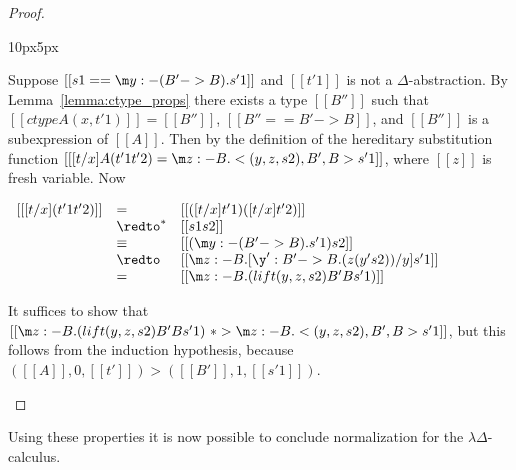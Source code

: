 \begin{proof}
\begin{changemargin}{10px}{5px}
\begin{itemize}
    Suppose $[[s1 == \m y:{-(B'->B)}.s'1]]$ and $[[t'1]]$ is not a $\Delta$-abstraction.
    By Lemma~\ref{lemma:ctype_props} there exists a type $[[B'']]$ such that
    $[[ctype A (x,t'1)]] = [[B'']]$, $[[B'' == B' -> B]]$, and $[[B'']]$ is a subexpression
    of $[[A]]$.  Then by the definition of the hereditary substitution function
    $[[ [t/x] A (t'1 t'2) = \m z:{-B}.<(y,z,s2),B',B>s'1]]$, where $[[z]]$ is fresh variable.
    Now
    \begin{center}
      \begin{math}
        \begin{array}{lll}
          [[ [t/x] (t'1 t'2)]] & = & [[([t/x] t'1) ([t/x] t'2)]]\\
          & \redto^* & [[s1 s2]]\\
          & \equiv & [[(\m y:{-(B'->B)}.s'1) s2]]\\
          & \redto & [[\m z:{-B}.[\y':B'->B.(z (y' s2))/y]s'1]]\\
          & = & [[\m z:{-B}.(lift (y,z,s2) B' B s'1)]]
        \end{array}
      \end{math}
    \end{center}
    It suffices to show that $[[\m z:{-B}.(lift (y,z,s2) B' B s'1) ~*> \m z:{-B}.<(y,z,s2),B',B>s'1]]$,
    but this follows from the induction hypothesis, because $([[A]],0,[[t']]) > ([[B']],1,[[s'1]])$.
  \end{itemize} 
  \end{changemargin}
\end{proof}
Using these properties it is now possible to conclude normalization for the $\lambda\Delta$-calculus.

